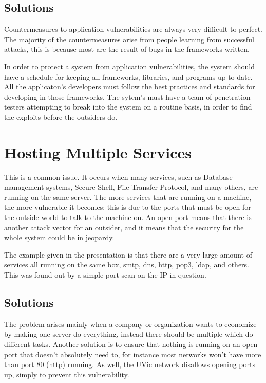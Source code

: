\documentclass{article}
\numberwithin{equation}{section} %
\numberwithin{figure}{section} %
\numberwithin{table}{section} %
\begin{document}
\subsection{Solutions}
Countermeasures to application vulnerabilities are always very difficult to perfect.  The majority of the countermeasures arise from people learning from successful attacks, this is because most are the result of bugs in the frameworks written.  

In order to protect a system from application vulnerabilities, the system should have a schedule for keeping all frameworks, libraries, and programs up to date.  All the applicaton's developers must follow the best practices and standards for developing in those frameworks.  The sytem's must have a team of penetration-testers attempting to break into the system on a routine basis, in order to find the exploits before the outsiders do.   

\section{Hosting Multiple Services}
This is a common issue.  It occurs when many services, such as Database management systems, Secure Shell, File Transfer Protocol, and many others, are running on the same server.  The more services that are running on a machine, the more vulnerable it becomes; this is due to the ports that must be open for the outside world to talk to the machine on.  An open port means that there is another attack vector for an outsider, and it means that the security for the whole system could be in jeopardy.

The example given in the presentation is that there are a very large amount of services all running on the same box, smtp, dns, http, pop3, ldap, and others.  This was found out by a simple port scan on the IP in question.  

\subsection{Solutions}
The problem arises mainly when a company or organization wants to economize by making one server do everything, instead there should be multiple which do different tasks.  Another solution is to ensure that nothing is running on an open port that doesn't absolutely need to, for instance most networks won't have more than port 80 (http) running.  As well, the UVic network disallows opening ports up, simply to prevent this vulnerability.


 

\end{document}

